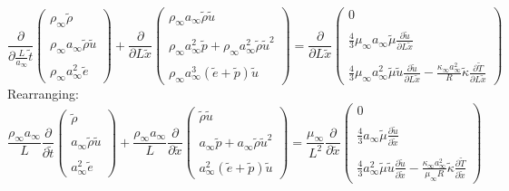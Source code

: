 \documentclass[11pt, a4paper]{article}
\newcommand{\parder}[2]{\frac{\partial {#1}}{\partial {#2}}}
\begin{document}
\begin{equation}
    \parder{}{\displaystyle\frac{L}{a_\infty}\tilde{t}}\begin{pmatrix}
        \rho_\infty\tilde{\rho} \\\\
        \rho_\infty a_\infty\tilde{\rho}\tilde{u} \\\\
        \rho_\infty a_\infty^2\tilde{e}
    \end{pmatrix}+\parder{}{L\tilde{x}}\begin{pmatrix}
        \rho_\infty a_\infty\tilde{\rho}\tilde{u} \\\\
        \rho_\infty a_\infty^2\tilde{p}+\rho_\infty a_\infty^2\tilde{\rho}\tilde{u}^2 \\\\
        \rho_\infty a_\infty^3\left(\tilde{e}+\tilde{p}\right)\tilde{u}
    \end{pmatrix}=\parder{}{L\tilde{x}}\begin{pmatrix}
        0 \\\\
        \displaystyle\frac{4}{3}\mu_\infty a_\infty\tilde{\mu} \parder{\tilde{u}}{L\tilde{x}} \\\\
        \displaystyle\frac{4}{3}\mu_\infty a_\infty^2\tilde{\mu}\tilde{u}\parder{\tilde{u}}{L\tilde{x}}-\frac{\kappa_\infty a_\infty^2}{R}\tilde{\kappa}\parder{\tilde{T}}{L\tilde{x}}
    \end{pmatrix}
\end{equation}
Rearranging:
\begin{equation}
    \frac{\rho_\infty a_\infty}{L}\parder{}{\tilde{t}}\begin{pmatrix}
        \tilde{\rho} \\\\
        a_\infty\tilde{\rho}\tilde{u} \\\\
        a_\infty^2\tilde{e}
    \end{pmatrix}+\frac{\rho_\infty a_\infty}{L}\parder{}{\tilde{x}}\begin{pmatrix}
        \tilde{\rho}\tilde{u} \\\\
        a_\infty\tilde{p}+a_\infty\tilde{\rho}\tilde{u}^2 \\\\
        a_\infty^2\left(\tilde{e}+\tilde{p}\right)\tilde{u}
    \end{pmatrix}=\frac{\mu_\infty}{L^2}\parder{}{\tilde{x}}\begin{pmatrix}
        0 \\\\
        \displaystyle\frac{4}{3}a_\infty\tilde{\mu} \parder{\tilde{u}}{\tilde{x}} \\\\
        \displaystyle\frac{4}{3}a_\infty^2\tilde{\mu}\tilde{u}\parder{\tilde{u}}{\tilde{x}}-\frac{\kappa_\infty a_\infty^2}{\mu_\infty R}\tilde{\kappa}\parder{\tilde{T}}{\tilde{x}}
    \end{pmatrix}
\end{equation}
\end{document}
